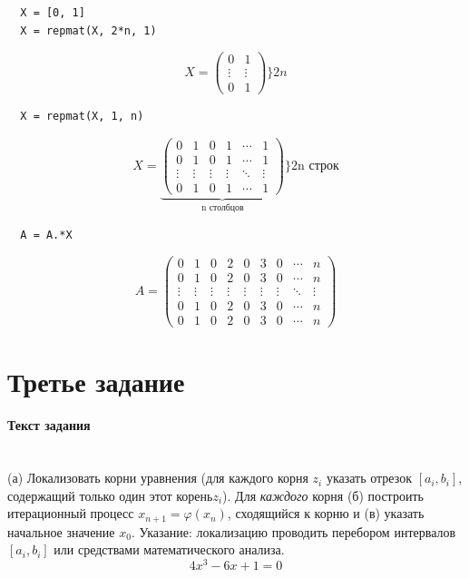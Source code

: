 \begin{lstlisting}
  X = [0, 1]
  X = repmat(X, 2*n, 1)
\end{lstlisting}
\[
  X =
  \begin{pmatrix}
    0 & 1 \\
    \vdots & \vdots \\
    0 & 1
  \end {pmatrix}
  \} 2n
\]

\begin{lstlisting}
  X = repmat(X, 1, n)
\end{lstlisting}
\[
  X =\underbrace{
  \begin{pmatrix}
    0 & 1 & 0 & 1 & \cdots & 1 \\
    0 & 1 & 0 & 1 & \cdots & 1 \\
    \vdots & \vdots & \vdots & \vdots & \ddots & \vdots \\
    0 & 1 & 0 & 1 & \cdots & 1
  \end{pmatrix}
}_{\text{n столбцов}} \}\text{2n строк}
\]

\begin{lstlisting}
  A = A.*X
\end{lstlisting}
\[
  A =
  \begin{pmatrix}
    0 & 1 & 0 & 2 & 0 & 3 & 0 & \cdots & n \\
    0 & 1 & 0 & 2 & 0 & 3 & 0 & \cdots & n \\
    \vdots & \vdots & \vdots & \vdots & \vdots & \vdots & \vdots & \ddots & \vdots \\
    0 & 1 & 0 & 2 & 0 & 3 & 0 & \cdots & n \\
    0 & 1 & 0 & 2 & 0 & 3 & 0 & \cdots & n
  \end{pmatrix}
\]

\section{Третье задание}

\paragraph{Текст задания} ~\\
(а) Локализовать корни уравнения (для каждого корня $z_{i}$ указать отрезок $[a_{i}, b_{i}]$, содержащий только один этот корень$z_{i}$). Для \textit{\textsl{каждого}} корня (б) построить итерационный процесс $x_{n+1} = \varphi(x_{n})$, сходящийся к корню и (в) указать начальное значение $x_{0}$. Указание: локализацию проводить перебором интервалов $[a_{i}, b_{i}]$ или средствами математического анализа.\\[2mm]
\[4x^{3} - 6x + 1 = 0\]

